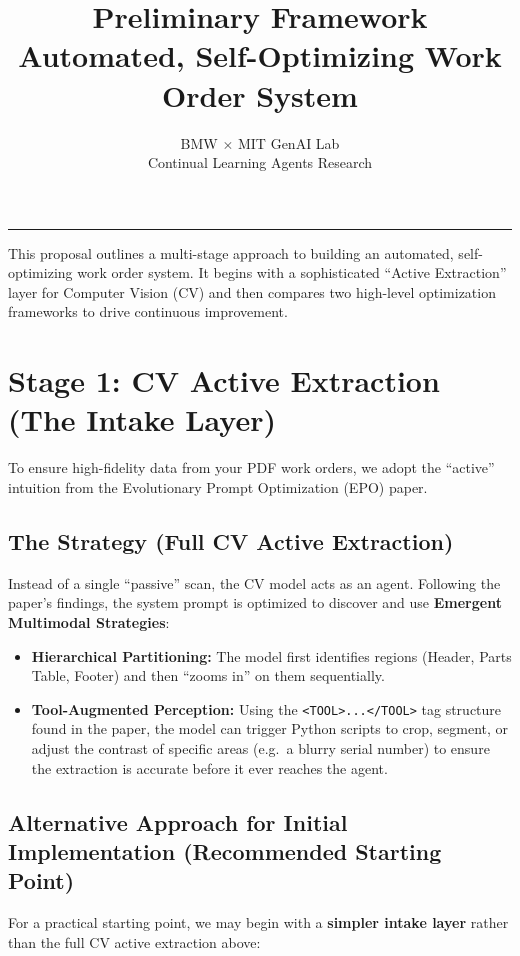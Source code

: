 \documentclass[11pt,a4paper]{article}
\title{Preliminary Framework\\Automated, Self-Optimizing Work Order System}
\author{BMW $\times$ MIT GenAI Lab\\Continual Learning Agents Research}
\date{}
\begin{document}
\maketitle
\vspace{0.5em}
\hrule
\vspace{0.8em}

This proposal outlines a multi-stage approach to building an automated, self-optimizing work order system. It begins with a sophisticated ``Active Extraction'' layer for Computer Vision (CV) and then compares two high-level optimization frameworks to drive continuous improvement.

\section{Stage 1: CV Active Extraction (The Intake Layer)}

To ensure high-fidelity data from your PDF work orders, we adopt the ``active'' intuition from the Evolutionary Prompt Optimization (EPO) paper.

\subsection{The Strategy (Full CV Active Extraction)}

Instead of a single ``passive'' scan, the CV model acts as an agent. Following the paper's findings, the system prompt is optimized to discover and use \textbf{Emergent Multimodal Strategies}:

\begin{itemize}
  \item \textbf{Hierarchical Partitioning:} The model first identifies regions (Header, Parts Table, Footer) and then ``zooms in'' on them sequentially.
  \item \textbf{Tool-Augmented Perception:} Using the \texttt{<TOOL>...</TOOL>} tag structure found in the paper, the model can trigger Python scripts to crop, segment, or adjust the contrast of specific areas (e.g.\ a blurry serial number) to ensure the extraction is accurate before it ever reaches the agent.
\end{itemize}

\subsection{Alternative Approach for Initial Implementation (Recommended Starting Point)}

For a practical starting point, we may begin with a \textbf{simpler intake layer} rather than the full CV active extraction above:
\end{document}
